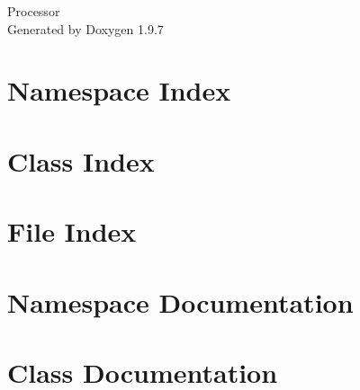 \documentclass[twoside]{book}
\newcommand{\+}{\discretionary{\mbox{\scriptsize$\hookleftarrow$}}{}{}}
\newcommand{\clearemptydoublepage}{%
    \newpage{\pagestyle{empty}\cleardoublepage}%
  }
\begin{document}
  \raggedbottom
    \hypersetup{pageanchor=false,
                bookmarksnumbered=true,
                pdfencoding=unicode
               }
  \begin{titlepage}
  \vspace*{7cm}
  \begin{center}%
  {\Large Processor}\\
  \vspace*{1cm}
  {\large Generated by Doxygen 1.9.7}\\
  \end{center}
  \end{titlepage}
  \clearemptydoublepage
  \tableofcontents
  \clearemptydoublepage
  \hypersetup{pageanchor=true}

\chapter{Namespace Index}

\chapter{Class Index}

\chapter{File Index}

\chapter{Namespace Documentation}

\chapter{Class Documentation}






















\end{document}
